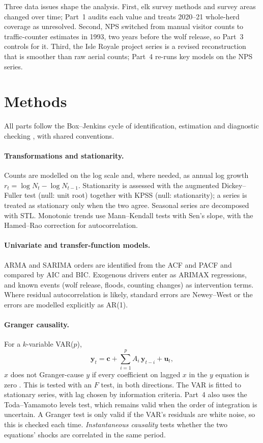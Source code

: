 \documentclass[11pt,a4paper]{article}
\begin{document}
Three data issues shape the analysis. First, elk survey methods and survey areas changed over time; Part~1 audits each value and treats 2020--21 whole-herd coverage as unresolved. Second, NPS switched from manual visitor counts to traffic-counter estimates in 1993, two years before the wolf release, so Part~3 controls for it. Third, the Isle Royale project series is a revised reconstruction that is smoother than raw aerial counts; Part~4 re-runs key models on the NPS series.

\section{Methods}
All parts follow the Box--Jenkins cycle of identification, estimation and diagnostic checking \citep{box2015}, with shared conventions.

\paragraph{Transformations and stationarity.} Counts are modelled on the log scale and, where needed, as annual log growth $r_t=\log N_t-\log N_{t-1}$. Stationarity is assessed with the augmented Dickey--Fuller test (null: unit root) together with KPSS (null: stationarity); a series is treated as stationary only when the two agree. Seasonal series are decomposed with STL. Monotonic trends use Mann--Kendall tests with Sen's slope, with the Hamed--Rao correction for autocorrelation.

\paragraph{Univariate and transfer-function models.} ARMA and SARIMA orders are identified from the ACF and PACF and compared by AIC and BIC. Exogenous drivers enter as ARIMAX regressions, and known events (wolf release, floods, counting changes) as intervention terms. Where residual autocorrelation is likely, standard errors are Newey--West or the errors are modelled explicitly as AR(1).

\paragraph{Granger causality.} For a $k$-variable VAR($p$),
\begin{equation}
\mathbf{y}_t=\mathbf{c}+\sum_{i=1}^{p}A_i\,\mathbf{y}_{t-i}+\mathbf{u}_t ,
\end{equation}
$x$ does not Granger-cause $y$ if every coefficient on lagged $x$ in the $y$ equation is zero \citep{granger1969}. This is tested with an $F$ test, in both directions. The VAR is fitted to stationary series, with lag chosen by information criteria. Part~4 also uses the Toda--Yamamoto levels test, which remains valid when the order of integration is uncertain. A Granger test is only valid if the VAR's residuals are white noise, so this is checked each time. \emph{Instantaneous causality} tests whether the two equations' shocks are correlated in the same period.
\end{document}
